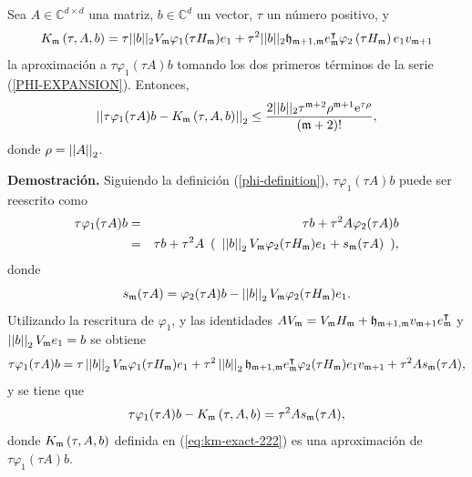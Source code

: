  \begin{lemma}\cite{naranjo2021locally}\label{lemma:CORRECTED-ERROR}
	Sea $A\in\mathbb{C}^{d\times d}$ una matriz, $b\in\mathbb{C}^{d}$ un vector, $\tau$ un número positivo, y
	\begin{equation}
		{K_{\mathfrak{m}}\left(\tau,A , b \right) = \tau ||b||_2 V_{\mathfrak{m}}\varphi_1(\tau H_{\mathfrak{m}})e_1}+\tau^2 ||b||_2 \mathfrak{h}_{\mathfrak{m}+1,\mathfrak{m}}e_{\mathfrak{m}}^\intercal\varphi_2\left(\tau H_{\mathfrak{m}}\right) e_1 v_{\mathfrak{m}+1} \label{eq:km-exact-222}
	\end{equation}
	 la aproximación a $\tau \varphi_1(\tau A)b$ tomando los dos primeros términos de la serie (\ref{PHI-EXPANSION}). Entonces,
	\begin{gather*}
	\left\lvert\left\lvert \tau\varphi_1(\tau A)b - K_{\mf}\left(\tau,A , b \right) \right\rvert\right\rvert_2%
	\leq \frac{2\vert\lvert b \rvert\rvert_2\tau^{\mf+2}\rho^{\mf+1}\me{\tau \rho}}{(\mf+2)!},
	\end{gather*}
	donde $\rho=\left\lvert \left\lvert A \right\rvert \right\rvert_2$.
\end{lemma}
\textbf{Demostración.}
Siguiendo la definición (\ref{phi-definition}), $\tau \varphi_1(\tau A)b$ puede ser reescrito como
\begin{eqnarray*}
	\tau \varphi_1(\tau A)b &=& \tau b+\tau^{2}A\varphi_{2}(\tau A)b \\
	&=& \tau b+\tau^{2}A \,\ (\,\ \nnorm{\nnorm{b}}_2V_\mf\varphi_{2}(\tau H_\mf)e_1 +s_\mf(\tau A) \,\ ), %
\end{eqnarray*}
donde \[ s_{\mathfrak{m}} (\tau A)= \varphi_{2}(\tau A)b -\left\lvert \left\lvert b \right\rvert \right\rvert_2V_{\mathfrak{m}}\varphi_{2}(\tau H_{\mathfrak{m}})e_1 .\]
Utilizando la rescritura de $\varphi_1$, y las identidades $AV_{\mathfrak{m}}=V_{\mathfrak{m}} H_{\mathfrak{m}} + \mathfrak{h}_{\mathfrak{m}+1,\mathfrak{m}}v_{\mathfrak{m}+1}e^\intercal_{\mathfrak{m}}$ y  $\left\lvert \left\lvert b \right\rvert \right\rvert_2V_{\mathfrak{m}} e_1=b$ se obtiene
\begin{equation}
\tau\varphi_1(\tau A)b = \tau\nnorm{\nnorm{b}}_2V_\mf\varphi_1(\tau H_\mf)e_1 + \tau^{2}\nnorm{\nnorm{b}}_2\hf_{\mf+1,\mf}e^\intercal_\mf\varphi_{2}(\tau H_\mf)e_1v_{\mf+1}+\tau^{2}As_\mf (\tau A), %
\end{equation}
y se tiene que
\begin{equation}
\tau\varphi_1(\tau A)b - K_{\mathfrak{m}}\left(\tau,A , b \right) = \tau^{2}As_{\mathfrak{m}}(\tau A), \label{eq:phidiffasm}
\end{equation}
donde $K_{\mathfrak{m}}\left(\tau,A , b \right)$ definida en (\ref{eq:km-exact-222}) es una aproximación de $\tau \varphi_1(\tau A)b$.

